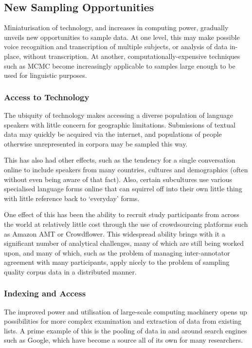 \subsection{New Sampling Opportunities}
Miniaturisation of technology, and increases in computing power, gradually unveils new opportunities to sample data.  At one level, this may make possible voice recognition and transcription of multiple subjects, or analysis of data in-place, without transcription.  At another, computationally-expensive techniques such as MCMC become increasingly applicable to samples large enough to be used for linguistic purposes.


\subsubsection{Access to Technology}
The ubiquity of technology makes accessing a diverse population of language speakers with little concern for geographic limitations.  Submissions of textual data may quickly be acquired via the internet, and populations of people otherwise unrepresented in corpora may be sampled this way.


This has also had other effects, such as the tendency for a single conversation online to include speakers from many countries, cultures and demographics (often without even being aware of that fact).  Also, certain subcultures use various specialised language forms online that can squirrel off into their own little thing with little reference back to `everyday' forms.

One effect of this has been the ability to recruit study participants from across the world at relatively little cost through the use of crowdsourcing platforms such as Amazon AMT\cite{ipeirotis2010analyzing} or Crowdflower\cite{Finin:2010:ANE:1866696.1866709}.  This widespread ability brings with it a significant number of analytical challenges, many of which are still being worked upon, and many of which, such as the problem of managing inter-annotator agreement with many participants, apply nicely to the problem of sampling quality corpus data in a distributed manner.

  


\subsubsection{Indexing and Access}
The improved power and utilisation of large-scale computing machinery opens up possibilities for more complex examination and extraction of data from existing lists.  A prime example of this is the pooling of data in and around search engines such as Google, which have become a source all of its own for many researchers.

